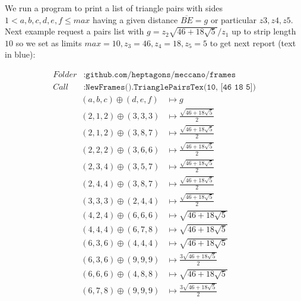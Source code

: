 \documentclass[11pt]{article}
\newenvironment{MyColorPar}[1]{
    \leavevmode\color{#1}\ignorespaces
}{
}
\begin{document}
We run a program to print a list of triangle pairs with sides $1 < a,b,c,d,e,f \leq max$ having a given distance $\overline{BE}=g$ or particular $z3,z4,z5$. Next example request a pairs list with $g = z_2\sqrt{46+18\sqrt{5}}/z_1$ up to strip length $10$ so we set as limits $max=10, z_3=46, z_4=18, z_5=5$ to get next report (text in blue):

\begin{MyColorPar}{blue}
\begin{align*}
Folder &: \texttt{github.com/heptagons/meccano/frames}\\
Call &: \texttt{NewFrames().TrianglePairsTex(10, [46 18 5])}\end{align*}
\begin{align*}
(a,b,c) \oplus (d,e,f) &\mapsto g\\
\hline
(2,1,2) \oplus (3,3,3) &\mapsto \frac{\sqrt{46+18\sqrt{5}}}{2} \\
(2,1,2) \oplus (3,8,7) &\mapsto \frac{\sqrt{46+18\sqrt{5}}}{2} \\
(2,2,2) \oplus (3,6,6) &\mapsto \frac{\sqrt{46+18\sqrt{5}}}{2} \\
(2,3,4) \oplus (3,5,7) &\mapsto \frac{\sqrt{46+18\sqrt{5}}}{2} \\
(2,4,4) \oplus (3,8,7) &\mapsto \frac{\sqrt{46+18\sqrt{5}}}{2} \\
(3,3,3) \oplus (2,4,4) &\mapsto \frac{\sqrt{46+18\sqrt{5}}}{2} \\
(4,2,4) \oplus (6,6,6) &\mapsto \sqrt{46+18\sqrt{5}} \\
(4,4,4) \oplus (6,7,8) &\mapsto \sqrt{46+18\sqrt{5}} \\
(6,3,6) \oplus (4,4,4) &\mapsto \sqrt{46+18\sqrt{5}} \\
(6,3,6) \oplus (9,9,9) &\mapsto \frac{3\sqrt{46+18\sqrt{5}}}{2} \\
(6,6,6) \oplus (4,8,8) &\mapsto \sqrt{46+18\sqrt{5}} \\
(6,7,8) \oplus (9,9,9) &\mapsto \frac{3\sqrt{46+18\sqrt{5}}}{2} \\
\end{align*}
\end{MyColorPar}
\end{document}
